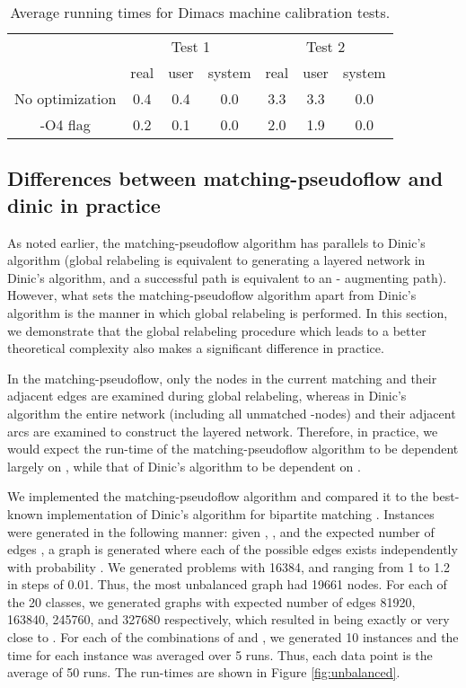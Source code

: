 \documentclass{article}
\begin{document}
\begin{table}[ht]
\begin{center}
\begin{tabular}{||c|ccc|ccc||}
\hline \hline
{} & \multicolumn{3}{c|}{Test 1} & \multicolumn{3}{c||}{Test 2}\\
{} & {real} & {user} & {system} & {real} & {user} & {system}\\
\hline
No optimization & 0.4 & 0.4 & 0.0 & 3.3 & 3.3 & 0.0\\
-O4 flag & 0.2 & 0.1 & 0.0 & 2.0 & 1.9 & 0.0\\
\hline \hline
\end{tabular}
\caption{\label{Table:machineCalib}Average running times for Dimacs machine calibration tests.}
\end{center}
\end{table}

\subsection{Differences between {\sf matching-pseudoflow} and {\sf dinic} in practice}

As noted earlier, the {\sf matching-pseudoflow} algorithm has parallels
to Dinic's algorithm (global relabeling is equivalent to generating a
layered network in Dinic's algorithm, and a successful path is
equivalent to an - augmenting path).  However, what sets the {\sf
matching-pseudoflow} algorithm apart from Dinic's algorithm is the
manner in which global relabeling is performed.  In this section, we
demonstrate that the global relabeling procedure which leads to a
better theoretical complexity also makes a significant difference in
practice.

In the {\sf matching-pseudoflow}, only the nodes in the current
matching and their adjacent edges are examined during global
relabeling, whereas in Dinic's algorithm the entire network (including
all unmatched -nodes) and their adjacent arcs are examined to
construct the layered network. Therefore, in practice, we would expect
the run-time of the {\sf matching-pseudoflow} algorithm to be dependent
largely on , while that of Dinic's algorithm to be dependent on
.

We implemented the {\sf matching-pseudoflow} algorithm and compared it to the best-known implementation of Dinic's algorithm for bipartite matching \cite{Set93}.  Instances were generated in the following manner: given , , and the expected number of edges ,  a graph is generated where each of the possible  edges exists independently with probability .  We generated problems with  16384, and  ranging from 1 to 1.2 in steps of 0.01.  Thus, the most unbalanced graph had 19661 nodes.  For each of the 20 classes, we generated graphs with expected number of edges 81920, 163840, 245760, and 327680 respectively, which resulted in  being exactly or very close to .  For each of the combinations of  and , we generated 10 instances and the time for each instance was averaged over 5 runs. Thus, each data point is the average of 50 runs.  The run-times are shown in Figure \ref{fig:unbalanced}.
\end{document}
